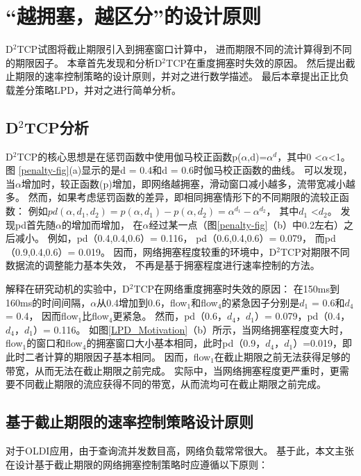  
 \section{“越拥塞，越区分”的设计原则}
 \label{sec_LPD:MORE_LOAD}
D$^2$TCP试图将截止期限引入到拥塞窗口计算中，
进而期限不同的流计算得到不同的期限因子。
本章首先发现和分析D$^2$TCP在重度拥塞时失效的原因。
然后提出截止期限的速率控制策略的设计原则，并对之进行数学描述。
最后本章提出正比负载差分策略LPD，并对之进行简单分析。

\subsection{D$^2$TCP分析}
\label{sec_LPD:gamma}
D$^2$TCP的核心思想是在惩罚函数中使用伽马校正函数p($\alpha$,d)=$\alpha^d$，其中0 <$\alpha$<1。
图 \ref{penalty-fig}(a)显示的是d = 0.4和d = 0.6时伽马校正函数的曲线。
可以发现，当$\alpha$增加时，较正函数(p)增加，即网络越拥塞，滑动窗口减小越多，流带宽减小越多。
然而，如果考虑惩罚函数的差异，即相同拥塞情形下的不同期限的流较正函数：
例如$pd(\alpha, d_{1}, d_{2})=p(\alpha, d_{1})-p(\alpha,d_{2})=\alpha^{d_{1}}-\alpha^{d_{2}}$，
其中$d_{1}$ <$d_{2}$。
发现pd首先随$\alpha$的增加而增加，
在$\alpha$经过某一点（图\ref{penalty-fig}（b）中0.2左右）之后减小。
例如，pd（0.4,0.4,0.6）= 0.116，
pd（0.6,0.4,0.6）= 0.079，
而pd（0.9,0.4,0.6）= 0.019。
因而，网络拥塞程度较重的环境中，D$^2$TCP对期限不同数据流的调整能力基本失效，
不再是基于拥塞程度进行速率控制的方法。
 
 
解释在研究动机的实验中，D$^2$TCP在网络重度拥塞时失效的原因：
在150ms到160ms的时间间隔，$\alpha$从0.4增加到0.6，flow$_1$和flow$_4$的紧急因子分别是$d_1$ = 0.6和$d_4$ = 0.4，
因而flow$_1$比flow$_4$更紧急。
然而，pd（0.6，$d_4$，$d_1$）= 0.079，pd（0.4，$d_4$，$d_1$）= 0.116。 
如图\ref{LPD_Motivation}（b）所示，当网络拥塞程度变大时，
flow$_1$的窗口和flow$_4$的拥塞窗口大小基本相同，此时pd（0.9，$d_4$，$d_1$）=0.019，即此时二者计算的期限因子基本相同。
因而，flow$_1$在截止期限之前无法获得足够的带宽，从而无法在截止期限之前完成。
实际中，当网络拥塞程度更严重时，更需要不同截止期限的流应获得不同的带宽，从而流均可在截止期限之前完成。


\subsection{基于截止期限的速率控制策略设计原则}
\label{sec_LPD:principle}

对于OLDI应用，由于查询流并发数目高，网络负载常常很大。
基于此，本文主张在设计基于截止期限的网络拥塞控制策略时应遵循以下原则：

